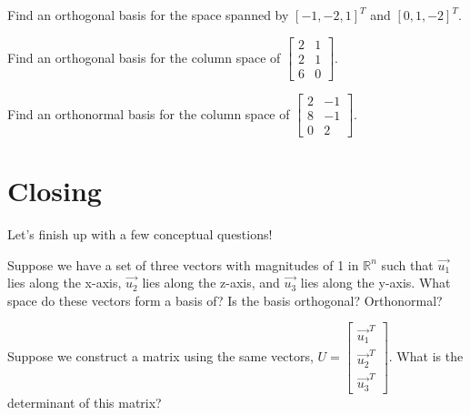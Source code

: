 \documentclass[11pt]{exam}
\begin{document}
    \vspace{20px}
    \begin{questions}
        \item Find an orthogonal basis for the space spanned by $[-1, -2, 1]^T$ and $[0,1,-2]^T$.
        \item Find an orthogonal basis for the column space of $\begin{bmatrix} 2 & 1 \\ 2 & 1 \\ 6 & 0 \end{bmatrix}$.
        \item Find an orthonormal basis for the column space of $\begin{bmatrix} 2 & -1 \\ 8 & -1 \\ 0 & 2 \end{bmatrix}$.
    \end{questions}

\pagebreak
\section{Closing}
Let's finish up with a few conceptual questions!
\begin{questions}
    \item Suppose we have a set of three vectors with magnitudes of 1 in $\mathbb{R}^n$ such that $\vec{u_1}$ lies along the x-axis,
    $\vec{u_2}$ lies along the z-axis, and $\vec{u_3}$ lies along the y-axis. What space do these vectors form a basis of?
    Is the basis orthogonal? Orthonormal?
    \item Suppose we construct a matrix using the same vectors, $U = \begin{bmatrix} \vec{u_1}^T \\ \vec{u_2}^T \\ \vec{u_3}^T \end{bmatrix}$. What
    is the determinant of this matrix?
\end{questions}
\end{document}
